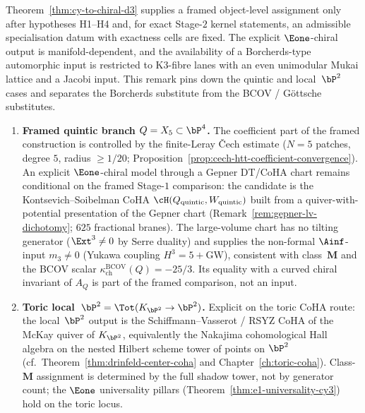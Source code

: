 \begin{remark}
\label{rem:phi3-quintic-local-p2}
Theorem~\ref{thm:cy-to-chiral-d3} supplies a framed object-level assignment only after hypotheses \textup{H1--H4} and, for exact Stage-$2$ kernel statements, an admissible specialisation datum with exactness cells are fixed. The explicit $\Eone$-chiral output is manifold-dependent, and the availability of a Borcherds-type automorphic input is restricted to K3-fibre lanes with an even unimodular Mukai lattice and a Jacobi input. This remark pins down the quintic and local~$\bP^2$ cases and separates the Borcherds substitute from the BCOV / G\"ottsche substitutes.
\begin{enumerate}[label=\textup{(\alph*)}]
 \item \textbf{Framed quintic branch $Q = X_5 \subset \bP^4$.} The coefficient part of the framed construction is controlled by the finite-Leray \v{C}ech estimate ($N=5$ patches, degree $5$, radius $\geq 1/20$; Proposition~\ref{prop:cech-htt-coefficient-convergence}). An explicit $\Eone$-chiral model through a Gepner DT/CoHA chart remains conditional on the framed Stage-$1$ comparison: the candidate is the Kontsevich--Soibelman CoHA $\cH(Q_{\mathrm{quintic}}, W_{\mathrm{quintic}})$ built from a quiver-with-potential presentation of the Gepner chart (Remark~\ref{rem:gepner-lv-dichotomy}; $625$ fractional branes). The large-volume chart has no tilting generator ($\Ext^3 \neq 0$ by Serre duality) and supplies the non-formal $\Ainf$-input $m_3 \neq 0$ (Yukawa coupling $H^3 = 5 + \mathrm{GW}$), consistent with class~$\mathbf{M}$ and the BCOV scalar $\kappa_{\mathrm{ch}}^{\mathrm{BCOV}}(Q)=-25/3$. Its equality with a curved chiral invariant of $A_Q$ is part of the framed comparison, not an input.
 \item \textbf{Toric local~$\bP^2 = \Tot(K_{\bP^2} \to \bP^2)$.} Explicit on the toric CoHA route: the local~$\bP^2$ output is the Schiffmann--Vasserot / RSYZ CoHA of the McKay quiver of $K_{\bP^2}$, equivalently the Nakajima cohomological Hall algebra on the nested Hilbert scheme tower of points on $\bP^2$ (cf.\ Theorem~\ref{thm:drinfeld-center-coha} and Chapter~\ref{ch:toric-coha}). Class-$\mathbf{M}$ assignment is determined by the full shadow tower, not by generator count; the $\Eone$ universality pillars (Theorem~\ref{thm:e1-universality-cy3}) hold on the toric locus.

\end{enumerate}
\end{remark}
